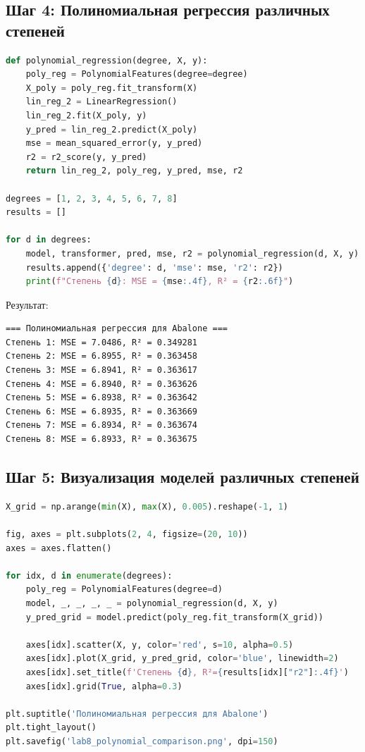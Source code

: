 \subsection{Шаг 4: Полиномиальная регрессия различных степеней}

\begin{lstlisting}[language=Python, caption=Построение полиномиальных моделей]
def polynomial_regression(degree, X, y):
    poly_reg = PolynomialFeatures(degree=degree)
    X_poly = poly_reg.fit_transform(X)
    lin_reg_2 = LinearRegression()
    lin_reg_2.fit(X_poly, y)
    y_pred = lin_reg_2.predict(X_poly)
    mse = mean_squared_error(y, y_pred)
    r2 = r2_score(y, y_pred)
    return lin_reg_2, poly_reg, y_pred, mse, r2

degrees = [1, 2, 3, 4, 5, 6, 7, 8]
results = []

for d in degrees:
    model, transformer, pred, mse, r2 = polynomial_regression(d, X, y)
    results.append({'degree': d, 'mse': mse, 'r2': r2})
    print(f"Степень {d}: MSE = {mse:.4f}, R² = {r2:.6f}")
\end{lstlisting}

Результат:

\begin{verbatim}
=== Полиномиальная регрессия для Abalone ===
Степень 1: MSE = 7.0486, R² = 0.349281
Степень 2: MSE = 6.8955, R² = 0.363458
Степень 3: MSE = 6.8941, R² = 0.363617
Степень 4: MSE = 6.8940, R² = 0.363626
Степень 5: MSE = 6.8938, R² = 0.363642
Степень 6: MSE = 6.8935, R² = 0.363669
Степень 7: MSE = 6.8934, R² = 0.363674
Степень 8: MSE = 6.8933, R² = 0.363675
\end{verbatim}

\subsection{Шаг 5: Визуализация моделей различных степеней}

\begin{lstlisting}[language=Python, caption=Визуализация моделей]
X_grid = np.arange(min(X), max(X), 0.005).reshape(-1, 1)

fig, axes = plt.subplots(2, 4, figsize=(20, 10))
axes = axes.flatten()

for idx, d in enumerate(degrees):
    poly_reg = PolynomialFeatures(degree=d)
    model, _, _, _, _ = polynomial_regression(d, X, y)
    y_pred_grid = model.predict(poly_reg.fit_transform(X_grid))
    
    axes[idx].scatter(X, y, color='red', s=10, alpha=0.5)
    axes[idx].plot(X_grid, y_pred_grid, color='blue', linewidth=2)
    axes[idx].set_title(f'Степень {d}, R²={results[idx]["r2"]:.4f}')
    axes[idx].grid(True, alpha=0.3)

plt.suptitle('Полиномиальная регрессия для Abalone')
plt.tight_layout()
plt.savefig('lab8_polynomial_comparison.png', dpi=150)
\end{lstlisting}

